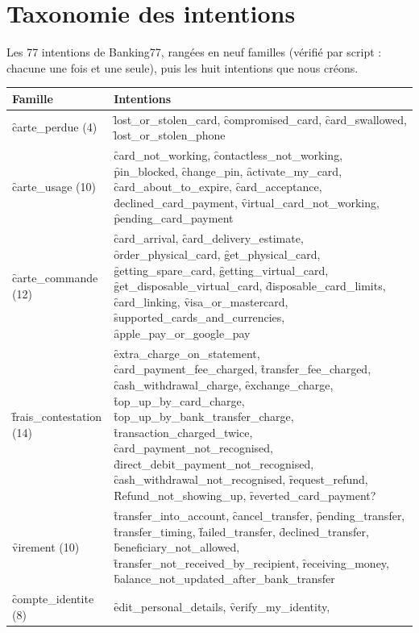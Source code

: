 \chapter{Taxonomie des intentions}
\label{an:taxonomie}

Les 77 intentions de Banking77, rangées en neuf familles (vérifié par script : chacune une fois et
une seule), puis les huit intentions que nous créons.

\begin{center}\footnotesize
\begin{longtable}{@{}L{3.1cm} L{11.3cm}@{}}
\toprule
\textbf{Famille} & \textbf{Intentions} \\
\midrule
\endhead
\f{carte\_perdue} (4) & \f{lost\_or\_stolen\_card}, \f{compromised\_card}, \f{card\_swallowed},
  \f{lost\_or\_stolen\_phone} \\
\addlinespace
\f{carte\_usage} (10) & \f{card\_not\_working}, \f{contactless\_not\_working}, \f{pin\_blocked},
  \f{change\_pin}, \f{activate\_my\_card}, \f{card\_about\_to\_expire}, \f{card\_acceptance},
  \f{declined\_card\_payment}, \f{virtual\_card\_not\_working}, \f{pending\_card\_payment} \\
\addlinespace
\f{carte\_commande} (12) & \f{card\_arrival}, \f{card\_delivery\_estimate},
  \f{order\_physical\_card}, \f{get\_physical\_card}, \f{getting\_spare\_card},
  \f{getting\_virtual\_card}, \f{get\_disposable\_virtual\_card}, \f{disposable\_card\_limits},
  \f{card\_linking}, \f{visa\_or\_mastercard}, \f{supported\_cards\_and\_currencies},
  \f{apple\_pay\_or\_google\_pay} \\
\addlinespace
\f{frais\_contestation} (14) & \f{extra\_charge\_on\_statement}, \f{card\_payment\_fee\_charged},
  \f{transfer\_fee\_charged}, \f{cash\_withdrawal\_charge}, \f{exchange\_charge},
  \f{top\_up\_by\_card\_charge}, \f{top\_up\_by\_bank\_transfer\_charge},
  \f{transaction\_charged\_twice}, \f{card\_payment\_not\_recognised},
  \f{direct\_debit\_payment\_not\_recognised}, \f{cash\_withdrawal\_not\_recognised},
  \f{request\_refund}, \f{Refund\_not\_showing\_up}, \f{reverted\_card\_payment?} \\
\addlinespace
\f{virement} (10) & \f{transfer\_into\_account}, \f{cancel\_transfer}, \f{pending\_transfer},
  \f{transfer\_timing}, \f{failed\_transfer}, \f{declined\_transfer}, \f{beneficiary\_not\_allowed},
  \f{transfer\_not\_received\_by\_recipient}, \f{receiving\_money},
  \f{balance\_not\_updated\_after\_bank\_transfer} \\
\addlinespace
\f{compte\_identite} (8) & \f{edit\_personal\_details}, \f{verify\_my\_identity},

\end{longtable}
\end{center}

